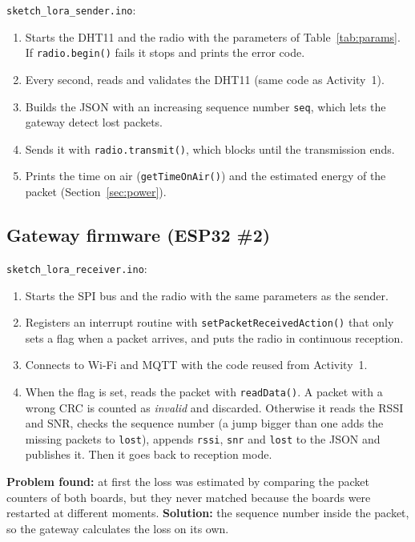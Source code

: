 \documentclass[11pt,a4paper]{article}
\begin{document}
\texttt{sketch\_lora\_sender.ino}:
\begin{enumerate}
  \item Starts the DHT11 and the radio with the parameters of Table~\ref{tab:params}. If
        \texttt{radio.begin()} fails it stops and prints the error code.
  \item Every second, reads and validates the DHT11 (same code as Activity~1).
  \item Builds the JSON with an increasing sequence number \texttt{seq}, which lets the
        gateway detect lost packets.
  \item Sends it with \texttt{radio.transmit()}, which blocks until the transmission ends.
  \item Prints the time on air (\texttt{getTimeOnAir()}) and the estimated energy of the
        packet (Section~\ref{sec:power}).
\end{enumerate}

\subsection{Gateway firmware (ESP32 \#2)}
\label{sec:gw}

\texttt{sketch\_lora\_receiver.ino}:
\begin{enumerate}
  \item Starts the SPI bus and the radio with the same parameters as the sender.
  \item Registers an interrupt routine with \texttt{setPacketReceivedAction()} that only sets
        a flag when a packet arrives, and puts the radio in continuous reception.
  \item Connects to Wi-Fi and MQTT with the code reused from Activity~1.
  \item When the flag is set, reads the packet with \texttt{readData()}. A packet with a wrong
        CRC is counted as \emph{invalid} and discarded. Otherwise it reads the RSSI and SNR,
        checks the sequence number (a jump bigger than one adds the missing packets to
        \texttt{lost}), appends \texttt{rssi}, \texttt{snr} and \texttt{lost} to the JSON and
        publishes it. Then it goes back to reception mode.
\end{enumerate}

\textbf{Problem found:} at first the loss was estimated by comparing the packet counters of
both boards, but they never matched because the boards were restarted at different moments.
\textbf{Solution:} the sequence number inside the packet, so the gateway calculates the loss
on its own.
\end{document}
